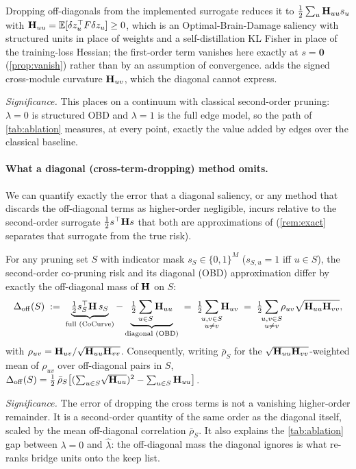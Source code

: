 \label{app:classical}
\begin{remark}\label{prop:obd}
Dropping off-diagonals from the implemented surrogate reduces it to $\tfrac12\sum_u\mathbf{H}_{uu}s_u$ with
$\mathbf{H}_{uu}=\mathbb{E}[\delta z_u^\top F\delta z_u]\ge0$, which is an Optimal-Brain-Damage saliency
\citep{lecun1989obd} with structured units in place of weights and a self-distillation KL Fisher in
place of the training-loss Hessian; the first-order term vanishes here exactly at $s=\mathbf 0$
(\cref{prop:vanish}) rather than by an assumption of convergence. \method adds the signed cross-module
curvature $\mathbf{H}_{uv}$, which the diagonal cannot express.
\end{remark}
\noindent\emph{Significance.} This places \method on a continuum with classical second-order pruning:
$\lambda{=}0$ is structured OBD and $\lambda{=}1$ is the full edge model, so the path of
\cref{tab:ablation} measures, at every point, exactly the value added by edges over the classical
baseline.

\paragraph{What a diagonal (cross-term-dropping) method omits.} We can quantify exactly the error that a
diagonal saliency, or any method that discards the off-diagonal terms as higher-order negligible,
incurs relative to the second-order surrogate
$\tfrac12 s^\top\mathbf{H} s$ that both are approximations of (\cref{rem:exact} separates that surrogate
from the true risk).
\begin{proposition}\label{prop:offdiag}
For any pruning set $S$ with indicator mask $s_S\in\{0,1\}^{M}$ ($s_{S,u}{=}1$ iff $u\in S$), the
second-order co-pruning risk and its diagonal (OBD) approximation differ by exactly the off-diagonal
mass of $\mathbf{H}$ on $S$:
\[
\Delta_{\rm off}(S)\;:=\;\underbrace{\tfrac12 s_S^\top\Hmat\,s_S}_{\text{full (\method)}}-\underbrace{\tfrac12\sum_{u\in S}\Hmat_{uu}}_{\text{diagonal (OBD)}}
\;=\;\tfrac12\!\!\sum_{\substack{u,v\in S\\ u\neq v}}\!\!\Hmat_{uv}
\;=\;\tfrac12\!\!\sum_{\substack{u,v\in S\\ u\neq v}}\!\!\rho_{uv}\sqrt{\Hmat_{uu}\Hmat_{vv}},
\]
with $\rho_{uv}=\mathbf{H}_{uv}/\sqrt{\mathbf{H}_{uu}\mathbf{H}_{vv}}$. Consequently, writing
$\bar\rho_S$ for the $\sqrt{\mathbf{H}_{uu}\mathbf{H}_{vv}}$-weighted mean of $\rho_{uv}$ over off-diagonal
pairs in $S$,
$\Delta_{\rm off}(S)=\tfrac12\,\bar\rho_S\big[(\sum_{u\in S}\!\sqrt{\mathbf{H}_{uu}})^2-\sum_{u\in S}\mathbf{H}_{uu}\big]$.
\end{proposition}
\noindent\emph{Significance.} The error of dropping the cross terms is not a vanishing higher-order
remainder. It is a second-order quantity of the same order as the diagonal itself, scaled by the
mean off-diagonal correlation $\bar\rho_S$. It also explains the
\cref{tab:ablation} gap between $\lambda{=}0$ and $\hat\lambda$: the off-diagonal
mass the diagonal ignores is what re-ranks bridge units onto the keep list.


